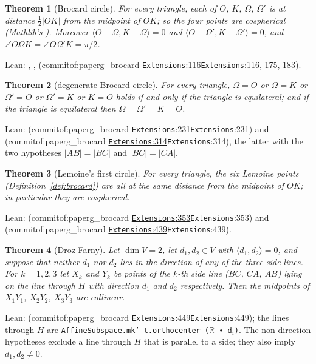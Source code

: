 \documentclass[11pt]{article}
\newtheorem{theorem}{Theorem}
\theoremstyle{definition}
\theoremstyle{remark}
\newcommand{\lean}[1]{\texttt{#1}}
\newcommand{\commitof}[1]{\csname commitof:#1\endcsname}
\newcommand{\repo}[1]{https://github.com/jpbald93/#1}
\newcommand{\src}[4]{\ifcsname commitof:#1\endcsname
  \href{\repo{#1}/blob/\commitof{#1}/#2/#3.lean\#L#4}{\texttt{#3}:#4}\else\texttt{#3}:#4\fi}
\begin{document}
\begin{theorem}[Brocard circle]\label{thm:brocardcircle}
For every triangle, each of $O$, $K$, $\Omega$, $\Omega'$ is at distance $\tfrac12|OK|$ from the
midpoint of $OK$; so the four points are cospherical (Mathlib's ).
Moreover $\langle O-\Omega,K-\Omega\rangle=0$ and $\langle O-\Omega',K-\Omega'\rangle=0$, and
$\angle O\Omega K=\angle O\Omega' K=\pi/2$.
\end{theorem}
Lean: , ,
 (\src{paperg_brocard}{Brocard}{Extensions}{116}, 175, 183).

\begin{theorem}[degenerate Brocard circle]\label{thm:degenerate}
For every triangle, $\Omega=O$ or $\Omega=K$ or $\Omega'=O$ or $\Omega'=K$ or $K=O$ holds if and only
if the triangle is equilateral; and if the triangle is equilateral then $\Omega=\Omega'=K=O$.
\end{theorem}
Lean:  (\src{paperg_brocard}{Brocard}{Extensions}{231}) and
(\src{paperg_brocard}{Brocard}{Extensions}{314}), the latter with the two hypotheses $|AB|=|BC|$ and
$|BC|=|CA|$.

\begin{theorem}[Lemoine's first circle]\label{thm:lemoine}
For every triangle, the six Lemoine points (Definition~\ref{def:brocard}) are all at the same distance
from the midpoint of $OK$; in particular they are cospherical.
\end{theorem}
Lean:  (\src{paperg_brocard}{Brocard}{Extensions}{353}) and
 (\src{paperg_brocard}{Brocard}{Extensions}{439}).

\begin{theorem}[Droz-Farny]\label{thm:droz}
Let $\dim V=2$, let $d_1,d_2\in V$ with $\langle d_1,d_2\rangle=0$, and suppose that neither $d_1$ nor
$d_2$ lies in the direction of any of the three side lines. For $k=1,2,3$ let $X_k$ and $Y_k$ be
points of the $k$-th side line ($BC$, $CA$, $AB$) lying on the line through $H$ with direction $d_1$
and $d_2$ respectively. Then the midpoints of $X_1Y_1$, $X_2Y_2$, $X_3Y_3$ are collinear.
\end{theorem}
Lean:  (\src{paperg_brocard}{Brocard}{Extensions}{449}); the lines through $H$
are \lean{AffineSubspace.mk' t.orthocenter (\(\mathbb{R}\) ∙ d\(_i\))}. The non-direction hypotheses
exclude a line through $H$ that is parallel to a side; they also imply $d_1,d_2\neq0$.
\end{document}
